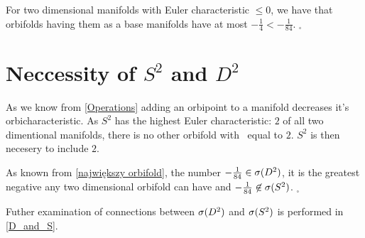 For 
two dimensional manifolds 
with Euler characteristic $\leq 0$, we have that orbifolds having them as a base manifolds 
have \Eoc at most $-\frac{1}{4} < -\frac{1}{84}$. 
$_\square$ 

\section{Neccessity of $S^2$ and $D^2$}\label{neccessity of d2 and s2}
As we know from \ref{Operations} adding an orbipoint to a manifold decreases it's 
orbicharacteristic. As $S^2$ has the highest Euler characteristic: $2$ of all 
two dimentional manifolds, there is no other orbifold with \Eoc\ equal to $2$. 
$S^2$ is then necesery to include $2$. 

As known from \ref{największy orbifold}, the number $-\frac{1}{84}\in{{\sigma}(D^2)}$, it is 
the greatest negative 
\Eoc any two dimensional orbifold can have and $-\frac{1}{84}\not\in{{\sigma}(S^2)}$. 
$_\square$  

Futher examination of connections between ${{\sigma}(D^2)}$ and ${{\sigma}(S^2)}$ is performed in \ref{D_and_S}.






